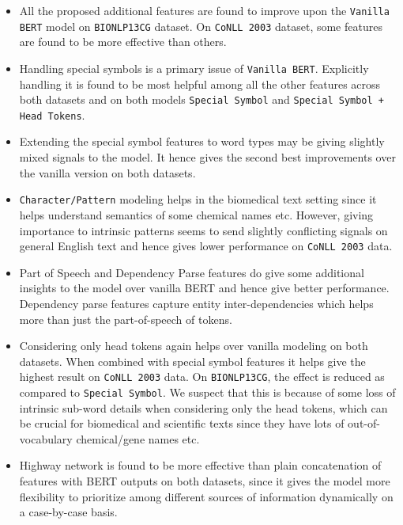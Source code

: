 \begin{itemize}
    \item All the proposed additional features are found to improve upon the \texttt{Vanilla BERT} model on \texttt{BIONLP13CG} dataset. On \texttt{CoNLL 2003} dataset, some features are found to be more effective than others.
    
    \item Handling special symbols is a primary issue of \texttt{Vanilla BERT}. Explicitly handling it is found to be most helpful among all the other features across both datasets and on both models \texttt{Special Symbol} and \texttt{Special Symbol + Head Tokens}.
    
    \item Extending the special symbol features to word types may be giving slightly mixed signals to the model. It hence gives the second best improvements over the vanilla version on both datasets.
    
    \item \texttt{Character/Pattern} modeling helps in the biomedical text setting since it helps understand semantics of some chemical names etc. However, giving importance to intrinsic patterns seems to send slightly conflicting signals on general English text and hence gives lower performance on \texttt{CoNLL 2003} data.
    
    \item Part of Speech and Dependency Parse features do give some additional insights to the model over vanilla BERT and hence give better performance. Dependency parse features capture entity inter-dependencies which helps more than just the part-of-speech of tokens.
    
    \item Considering only head tokens again helps over vanilla modeling on both datasets. When combined with special symbol features it helps give the highest result on \texttt{CoNLL 2003} data. On \texttt{BIONLP13CG}, the effect is reduced as compared to \texttt{Special Symbol}. We suspect that this is because of some loss of intrinsic sub-word details when considering only the head tokens, which can be crucial for biomedical and scientific texts since they have lots of out-of-vocabulary chemical/gene names etc.
    
    \item Highway network is found to be more effective than plain concatenation of features with BERT outputs on both datasets, since it gives the model more flexibility to prioritize among different sources of information dynamically on a case-by-case basis.
\end{itemize}

